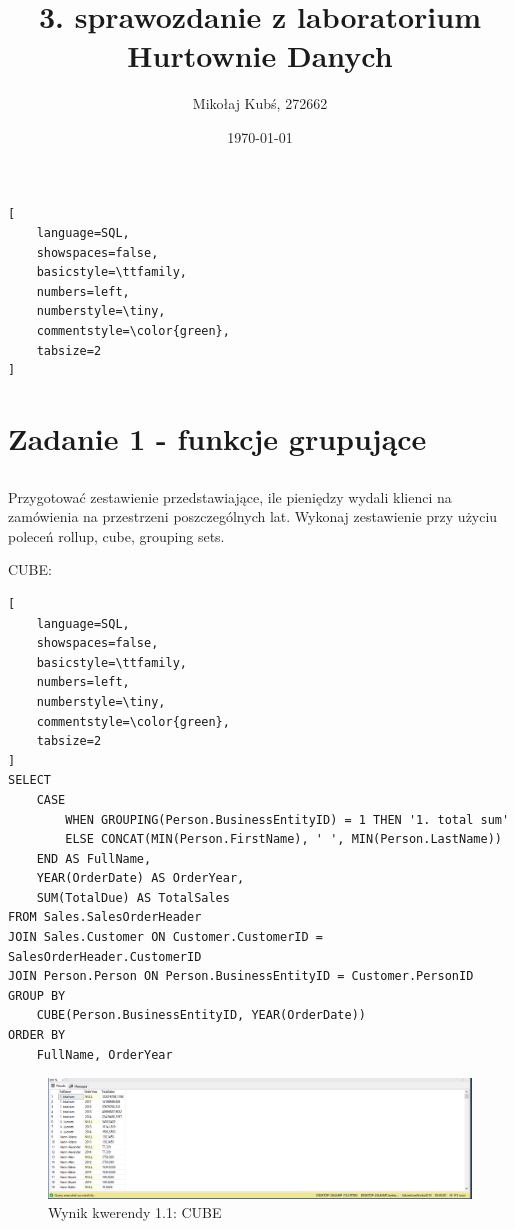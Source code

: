 \documentclass[a4paper,12pt]{article}
\title{3. sprawozdanie z laboratorium Hurtownie Danych}
\author{Mikołaj Kubś, 272662}
\date{\today}
\begin{document}
\maketitle

{\small
  \begin{lstlisting}[
	language=SQL,
	showspaces=false,
	basicstyle=\ttfamily,
	numbers=left,
	numberstyle=\tiny,
	commentstyle=\color{green},
	tabsize=2
]
\end{lstlisting}}

\section{Zadanie 1 - funkcje grupujące}

\subsection{}

Przygotować zestawienie przedstawiające, ile pieniędzy wydali klienci na zamówienia
na przestrzeni poszczególnych lat.
Wykonaj zestawienie przy użyciu poleceń rollup, cube, grouping sets.

CUBE:

{\small
\begin{lstlisting}[
	language=SQL,
	showspaces=false,
	basicstyle=\ttfamily,
	numbers=left,
	numberstyle=\tiny,
	commentstyle=\color{green},
	tabsize=2
]
SELECT
    CASE 
        WHEN GROUPING(Person.BusinessEntityID) = 1 THEN '1. total sum'
        ELSE CONCAT(MIN(Person.FirstName), ' ', MIN(Person.LastName))
    END AS FullName,
    YEAR(OrderDate) AS OrderYear,
    SUM(TotalDue) AS TotalSales
FROM Sales.SalesOrderHeader
JOIN Sales.Customer ON Customer.CustomerID = SalesOrderHeader.CustomerID
JOIN Person.Person ON Person.BusinessEntityID = Customer.PersonID
GROUP BY 
    CUBE(Person.BusinessEntityID, YEAR(OrderDate))
ORDER BY 
    FullName, OrderYear
\end{lstlisting}}

\begin{figure}[H]
  \centering
  \includegraphics[width=1.0\textwidth]{images/1.1_cube.png}
  \caption{Wynik kwerendy 1.1: CUBE}
\end{figure}
\end{document}
